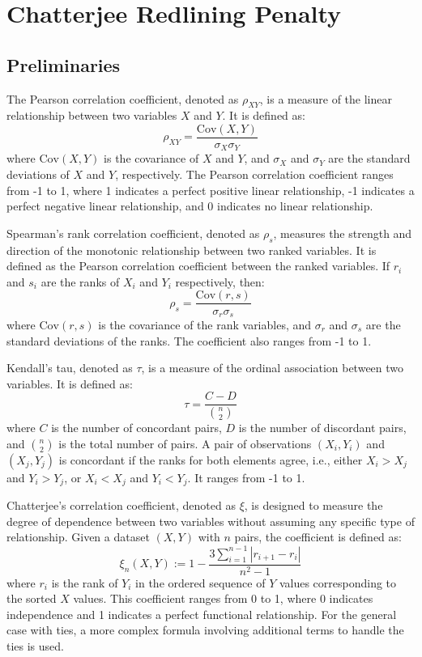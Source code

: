 \chapter{Chatterjee Redlining Penalty}

\section{Preliminaries}

The Pearson correlation coefficient, denoted as $\rho_{XY}$, is a measure of the linear relationship between two variables $X$ and $Y$. It is defined as:
\[
\rho_{XY} = \frac{\mathrm{Cov}(X, Y)}{\sigma_X \sigma_Y}
\]
where $\mathrm{Cov}(X, Y)$ is the covariance of $X$ and $Y$, and $\sigma_X$ and $\sigma_Y$ are the standard deviations of $X$ and $Y$, respectively. The Pearson correlation coefficient ranges from -1 to 1, where 1 indicates a perfect positive linear relationship, -1 indicates a perfect negative linear relationship, and 0 indicates no linear relationship.

Spearman's rank correlation coefficient, denoted as $\rho_s$, measures the strength and direction of the monotonic relationship between two ranked variables. It is defined as the Pearson correlation coefficient between the ranked variables. If $r_i$ and $s_i$ are the ranks of $X_i$ and $Y_i$ respectively, then:
\[
\rho_s = \frac{\mathrm{Cov}(r, s)}{\sigma_r \sigma_s}
\]
where $\mathrm{Cov}(r, s)$ is the covariance of the rank variables, and $\sigma_r$ and $\sigma_s$ are the standard deviations of the ranks. The coefficient also ranges from -1 to 1.

Kendall's tau, denoted as $\tau$, is a measure of the ordinal association between two variables. It is defined as:
\[
\tau = \frac{C - D}{\binom{n}{2}}
\]
where $C$ is the number of concordant pairs, $D$ is the number of discordant pairs, and $\binom{n}{2}$ is the total number of pairs. A pair of observations $(X_i, Y_i)$ and $(X_j, Y_j)$ is concordant if the ranks for both elements agree, i.e., either $X_i > X_j$ and $Y_i > Y_j$, or $X_i < X_j$ and $Y_i < Y_j$. It ranges from -1 to 1.

Chatterjee's correlation coefficient, denoted as $\xi$, is designed to measure the degree of dependence between two variables without assuming any specific type of relationship. Given a dataset $(X, Y)$ with $n$ pairs, the coefficient is defined as:
\[
\xi_n(X,Y) := 1 - \frac{3 \sum_{i=1}^{n-1} |r_{i+1} - r_i|}{n^2 - 1}
\]
where $r_i$ is the rank of $Y_i$ in the ordered sequence of $Y$ values corresponding to the sorted $X$ values. This coefficient ranges from 0 to 1, where 0 indicates independence and 1 indicates a perfect functional relationship. For the general case with ties, a more complex formula involving additional terms to handle the ties is used.


